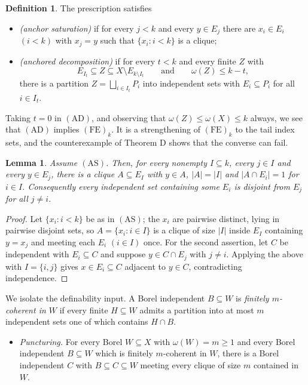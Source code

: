 \documentclass[11pt,reqno]{amsart}
\theoremstyle{plain}
\newtheorem{lemma}[theorem]{Lemma}
\theoremstyle{definition}
\newtheorem{definition}[theorem]{Definition}
\theoremstyle{remark}
\newcommand{\cl}{\omega}
\begin{document}
\begin{definition}
\label{def:AS-AD}
The prescription satisfies
\begin{itemize}
\item[$\mathrm{(AS)}$] \emph{(anchor saturation)} if for every $j<k$ and
every $y\in E_j$ there are $x_i\in E_i$ $(i<k)$ with $x_j=y$ such that
$\{x_i:i<k\}$ is a clique;
\item[$\mathrm{(AD)}$] \emph{(anchored decomposition)} if for every $t<k$
and every finite $Z$ with
\[
E_{I_t}\subseteq Z\subseteq X\setminus E_{k\setminus I_t}
\qquad\text{and}\qquad
\cl(Z)\le k-t,
\]
there is a partition $Z=\bigsqcup_{i\in I_t}P_i$ into independent sets
with $E_i\subseteq P_i$ for all $i\in I_t$.
\end{itemize}
\end{definition}

Taking $t=0$ in $\mathrm{(AD)}$, and observing that $\cl(Z)\le\cl(X)\le k$
always, we see that $\mathrm{(AD)}$ implies $\mathrm{(FE)}_k$. It is a
strengthening of $\mathrm{(FE)}_k$ to the tail index sets, and the counterexample of Theorem D shows that the converse can fail.

\begin{lemma}
\label{lem:AS-consequences}
Assume $\mathrm{(AS)}$. Then, for every nonempty $I\subseteq k$, every
$j\in I$ and every $y\in E_j$, there is a clique $A\subseteq E_I$ with
$y\in A$, $|A|=|I|$ and $|A\cap E_i|=1$ for $i\in I$. Consequently every
independent set containing some $E_i$ is disjoint from $E_j$ for all $j\neq i$.
\end{lemma}

\begin{proof}
Let $\{x_i:i<k\}$ be as in $\mathrm{(AS)}$; the $x_i$ are pairwise distinct,
lying in pairwise disjoint sets, so $A=\{x_i:i\in I\}$ is a clique of size
$|I|$ inside $E_I$ containing $y=x_j$ and meeting each $E_i$ $(i\in I)$ once.
For the second assertion, let $C$ be independent with $E_i\subseteq C$ and
suppose $y\in C\cap E_j$ with $j\neq i$. Applying the above with $I=\{i,j\}$
gives $x\in E_i\subseteq C$ adjacent to $y\in C$, contradicting independence.
\end{proof}

We isolate the definability input. A Borel independent $B\subseteq W$ is
\emph{finitely $m$-coherent in $W$} if every finite $H\subseteq W$ admits a
partition into at most $m$ independent sets one of which contains $H\cap B$.

\begin{itemize}
\item[$\mathrm{(PU)}$] \emph{Puncturing.} For every Borel $W\subseteq X$ with
$\cl(W)=m\ge1$ and every Borel independent $B\subseteq W$ which is finitely
$m$-coherent in $W$, there is a Borel independent $C$ with
$B\subseteq C\subseteq W$ meeting every clique of size $m$ contained in $W$.
\end{itemize}
\end{document}
